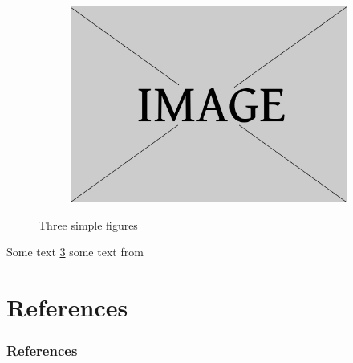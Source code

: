 \documentclass[aspectratio=169, serif ]{beamer}
\begin{document}
\begin{frame}
\begin{figure}
\begin{subfigure}[b]{0.3\textwidth}
         \caption{}
         \label{fig:b}
     \end{subfigure}
     \hfill
     \begin{subfigure}[b]{0.3\textwidth}
         \centering
         \includegraphics[width=\textwidth]{Figures/example.jpg}
         \caption{}
         \label{fig:c}
     \end{subfigure}
        \caption{Three simple figures}
        \label{fig:three graphs}
    \end{figure}
    Some text \ref{fig:three graphs} some text from \cite{newton1952opticks}
\end{frame}


\section{References}
\begin{frame}
 \frametitle{\textcolor{CatalinaBlue}{References}}
 
    
    { \fontsize{7}{10}\selectfont
    
    }
\end{frame}
\end{document}

